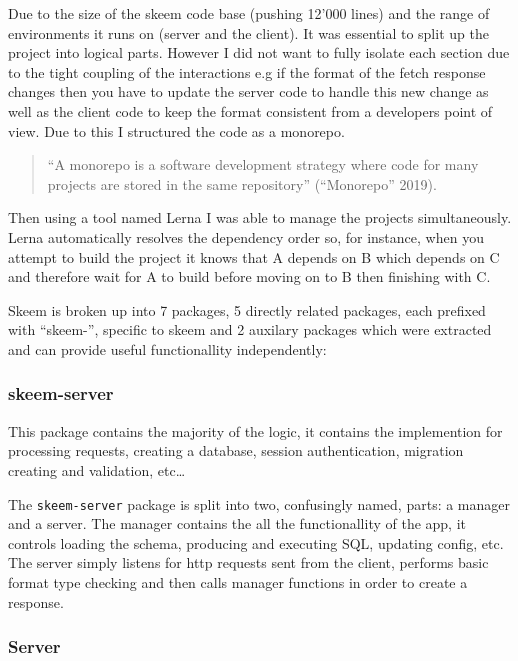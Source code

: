 \documentclass[
  12pt,
]{article}
\newcommand{\passthrough}[1]{#1}
\begin{document}
Due to the size of the skeem code base (pushing 12'000 lines) and the
range of environments it runs on (server and the client). It was
essential to split up the project into logical parts. However I did not
want to fully isolate each section due to the tight coupling of the
interactions e.g if the format of the fetch response changes then you
have to update the server code to handle this new change as well as the
client code to keep the format consistent from a developers point of
view. Due to this I structured the code as a monorepo.

\begin{quote}
``A monorepo is a software development strategy where code for many
projects are stored in the same repository'' (``Monorepo'' 2019).
\end{quote}

Then using a tool named Lerna I was able to manage the projects
simultaneously. Lerna automatically resolves the dependency order so,
for instance, when you attempt to build the project it knows that A
depends on B which depends on C and therefore wait for A to build before
moving on to B then finishing with C.

Skeem is broken up into 7 packages, 5 directly related packages, each
prefixed with ``skeem-'', specific to skeem and 2 auxilary packages
which were extracted and can provide useful functionallity
independently:

\hypertarget{skeem-server}{%
\subsubsection{skeem-server}\label{skeem-server}}

This package contains the majority of the logic, it contains the
implemention for processing requests, creating a database, session
authentication, migration creating and validation, etc\ldots{}

The \passthrough{\lstinline!skeem-server!} package is split into two,
confusingly named, parts: a manager and a server. The manager contains
the all the functionallity of the app, it controls loading the schema,
producing and executing SQL, updating config, etc. The server simply
listens for http requests sent from the client, performs basic format
type checking and then calls manager functions in order to create a
response.

\hypertarget{server}{%
\subsubsection{Server}\label{server}}
\end{document}

